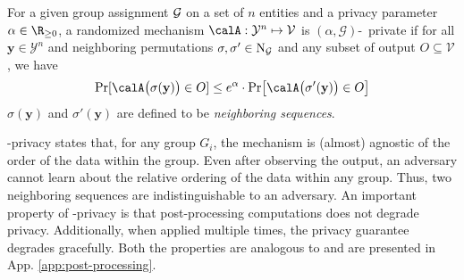  \vspace{-0.1cm}\begin{defn} For a given group assignment $\mathcal{G}$ on a set of $n$ entities and a privacy parameter $\alpha \in \R_{\geq0}$, a randomized  mechanism $\calA: \mathcal{Y}^n \mapsto \mathcal{V} $ is $(\alpha,\mathcal{G})$-\name~private if for all $\mathbf{y} \in \mathcal{Y}^n$ and neighboring permutations $\sigma, \sigma' \in \mathrm{N}_{\mathcal{G}}$ and any subset of output $O\subseteq \mathcal{V}$, we have
\vspace{0.1cm} 
\begin{equation} 
    \mathrm{Pr}[\calA\big(\sigma(\mathbf{y})\big) \in O] \leq e^\alpha \cdot \mathrm{Pr}\big[\calA\big(\sigma'(\mathbf{y})\big) \in O \big] \label{eq:privacy} 
\end{equation}   
 $\sigma(\mathbf{y})$ and $\sigma'(\mathbf{y})$  are defined to be \textit{neighboring sequences}. 
\label{def:privacy}\end{defn} \vspace{-0.2cm}
 \name-privacy states that, for any group $G_i$,  the mechanism is (almost) agnostic of the order of the data within the group.  Even after observing the output, an adversary cannot learn about the relative ordering of the data within any group. Thus, two neighboring sequences are indistinguishable to an adversary. %
An important property of \name-privacy is that post-processing computations does not degrade privacy. Additionally, when applied multiple times, the privacy guarantee degrades gracefully. Both the properties are analogous to \DP and are presented in App. \ref{app:post-processing}. %
 \begin{comment}
    
\begin{lem} 
    An $\epsilon$-\ldp mechanism is $(k\epsilon, \calG)$-\name~ private for any group assignment $\calG$ such that $
        k \geq \max_{G_i \in \calG} |G_i|
$ (proof in App. \ref{app:post-processing}).\label{lemma:LDP} \vspace{-0.2cm}
\end{lem} 
 \end{comment}

